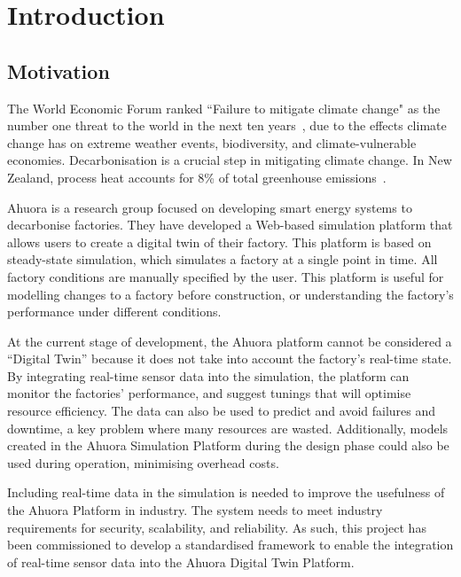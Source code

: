 \chapter{Introduction}



\section{Motivation}

The World Economic Forum ranked ``Failure to mitigate climate change" as the number one threat to the world in the next ten years~\cite{GlobalRisksReport}, due to the effects climate change has on extreme weather events, biodiversity, and climate-vulnerable economies. Decarbonisation is a crucial step in mitigating climate change. In New Zealand, process heat accounts for 8\% of total greenhouse emissions~\cite{DecarbonisingProcessHeat}.

Ahuora is a research group focused on developing smart energy systems to decarbonise factories. They have developed a Web-based simulation platform that allows users to create a digital twin of their factory.
This platform is based on steady-state simulation, which simulates a factory at a single point in time. All factory conditions are manually specified by the user.
This platform is useful for modelling changes to a factory before construction, or understanding the factory's performance under different conditions.

At the current stage of development, the Ahuora platform cannot be considered a ``Digital Twin'' because it does not take into account the factory's real-time state.
By integrating real-time sensor data into the simulation, the platform can monitor the factories' performance, and suggest tunings that will optimise resource efficiency.
The data can also be used to predict and avoid failures and downtime, a key problem where many resources are wasted.
Additionally, models created in the Ahuora Simulation Platform during the design phase could also be used during operation, minimising overhead costs.

Including real-time data in the simulation is needed to improve the usefulness of the Ahuora Platform in industry.
The system needs to meet industry requirements for security, scalability, and reliability. As such, this project
has been commissioned to develop a standardised framework to enable the integration of real-time sensor data into the Ahuora Digital Twin Platform.

